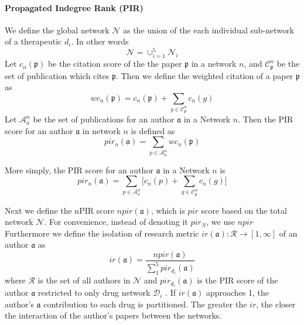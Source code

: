 \documentclass[10pt,letterpaper]{article}
\begin{document}
\paragraph{Propagated Indegree Rank (PIR)} We define the global network $\mathcal{N}$ as the union of the each individual sub-network of a therapeutic $d_i$. In other words 
$$ \mathcal{N} = \cup_{i =1}^{5} \mathcal{N}_i $$
Let $c_n(\mathfrak{p})$ be the citation score of the the paper $\mathfrak{p}$ in a network $n$, and $\mathcal{C}_\mathfrak{p}^n$ be the set of publication which cites $\mathfrak{p}$. Then we define the weighted citation of a paper $\mathfrak{p}$ as $$wc_n(\mathfrak{p}) = c_n(\mathfrak{p}) + \sum_{g\in \mathcal{C}_\mathfrak{p}^n}  c_n(g) $$
Let $\mathcal{A}_a^n$ be the set of publications for an author $\mathfrak{a}$ in a Network $n$. Then the PIR score  for an author $\mathfrak{a}$  in network $n$ is defined as $$ pir_n(\mathfrak{a}) =  \sum_{p\in \mathcal{A}_a^n}  wc_n(\mathfrak{p}) $$

More simply, the PIR score for an author  $\mathfrak{a}$ in a Network $n$ is  $$ pir_n(\mathfrak{a}) =  \sum_{p\in \mathcal{A}_a^n } \big[c_n(p) + \sum_{g\in \mathcal{C}_\mathfrak{p}^n}  c_n(g)\big] $$

Next we define the nPIR score $npir(\mathfrak{a})$, which is $pir$ score based on the  total network $\mathcal{N}$. For convenience, instead of denoting it $pir_N$, we use $npir$   Furthermore  we define the isolation of  research  metric $ir(\mathfrak{a}):\mathcal{R}\rightarrow [1,\infty]$  of an author $\mathfrak{a}$ as 
$$ir(\mathfrak{a})= \dfrac{ npir({\mathfrak{a}})} {\sum_{1}^{5} pir_{d_i}(\mathfrak{a})} $$
where $\mathcal{R}$ is the set of all authors in $\mathcal{N}$  and  $pir_{d_i}(\mathfrak{a})$ is the PIR score of the author $\mathfrak{a}$ restricted to only drug network $\mathcal{D}_i$ . If $ir(\mathfrak{a})$ approaches 1, the author's $\mathfrak{a}$ contribution to each drug is partitioned. The greater the $ir$, the closer  the interaction of the author's papers between the networks. 
\end{document}
